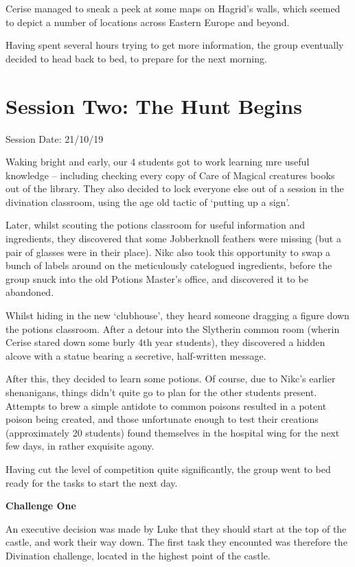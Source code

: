 \documentclass[oneside]{book}
\begin{document}
Cerise managed to sneak a peek at some maps on Hagrid's walls, which seemed to depict a number of locations across Eastern Europe and beyond. 

Having spent several hours trying to get more information, the group eventually decided to head back to bed, to prepare for the next morning. 

\section{Session Two: The Hunt Begins}

Session Date: 21/10/19

Waking bright and early, our 4 students got to work learning mre useful knowledge -- including checking every copy of Care of Magical creatures books out of the library. They also decided to lock everyone else out of a session in the divination classroom, using the age old tactic of `putting up a sign'. 

Later, whilst scouting the potions classroom for useful information and ingredients, they discovered that some Jobberknoll feathers were missing (but a pair of glasses were in their place). Nikc also took this opportunity to swap a bunch of labels around on the meticulously catelogued ingredients, before the group snuck into the old Potions Master's office, and discovered it to be abandoned.

Whilst hiding in the new `clubhouse', they heard someone dragging a figure down the potions classroom. After a detour into the Slytherin common room (wherin Cerise stared down some burly 4th year students), they discovered a hidden alcove with a statue bearing a secretive, half-written message. 

After this, they decided to learn some potions. Of course, due to Nikc's earlier shenanigans, things didn't quite go to plan for the other students present. Attempts to brew a simple antidote to common poisons resulted in a potent poison being created, and those unfortunate enough to test their creations (approximately 20 students) found themselves in the hospital wing for the next few days, in rather exquisite agony. 

Having cut the level of competition quite significantly, the group went to bed ready for the tasks to start the next day. 

\newpage
{\bf Challenge One}

An executive decision was made by Luke that they should start at the top of the castle, and work their way down. The first task they encounted was therefore the Divination challenge, located in the highest point of the castle. 
\end{document}
